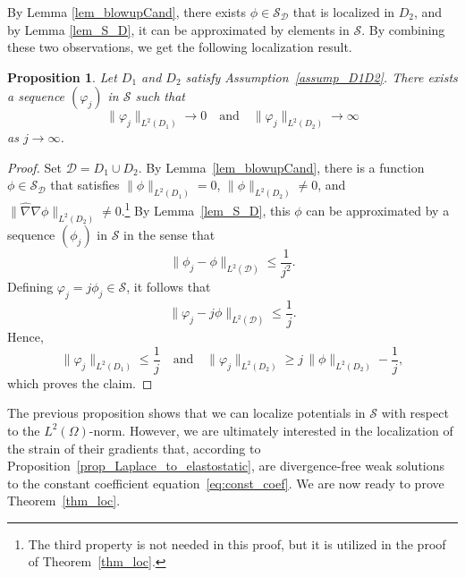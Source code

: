 \documentclass[reqno]{amsart}
\numberwithin{equation}{section}
\numberwithin{figure}{section}
\numberwithin{table}{section}
\newcommand{\norm}[1]{\lVert#1\rVert}
\newcommand{\D}{\mathcal{D}}
\theoremstyle{definition}
\theoremstyle{plain}
\newtheorem{prop}[thm]{Proposition}
\theoremstyle{definition}
\theoremstyle{remark}
\numberwithin{equation}{section}
\begin{document}
By Lemma \ref{lem_blowupCand}, there exists $\phi \in \mathcal{S}_{\D}$ that is localized in $D_2$, and by Lemma \ref{lem_S_D}, it can be approximated by elements in $\mathcal{S}$. By combining these two observations, we get the following localization result.

\begin{prop} \label{prop_localization1}
	Let $D_1$ and $D_2$ satisfy Assumption~\ref{assump_D1D2}. There exists a sequence $(\varphi_j)$ in $\mathcal{S}$ such that 
	\begin{equation*}
		\norm{\varphi_j}_{L^2(D_1)} \to 0 \quad \text{and} \quad \norm{\varphi_j}_{L^2(D_2)} \to \infty
	\end{equation*}
	as $j \to \infty$.
\end{prop}

\begin{proof}
	Set $\D = D_1 \cup D_2$. By Lemma~\ref{lem_blowupCand}, there is a function $\phi \in \mathcal{S}_{\D}$ that satisfies $\norm{\phi}_{L^2(D_1)} = 0$, $\norm{\phi}_{L^2(D_2)} \neq 0$, and $\norm{\widehat{\nabla}\nabla\phi}_{L^2(D_2)} \not= 0$.\footnote{The third property is not needed in this proof, but it is utilized in the proof of Theorem~\ref{thm_loc}.} By Lemma~\ref{lem_S_D}, this $\phi$ can be approximated by a sequence $(\phi_j)$ in $\mathcal{S}$ in the sense that 
	\begin{equation} \label{eq:phi_conv}
		\norm{\phi_j - \phi}_{L^2(\D) } \leq \frac{1}{j^2}.
	\end{equation}
	Defining $\varphi_j = j \phi_j \in\mathcal{S}$, it follows that
	\begin{equation*}
		\norm{\varphi_j - j \phi}_{L^2(\D) } \leq \frac{1}{j}.
	\end{equation*}
	Hence,
	\begin{equation*}
		\norm{\varphi_j}_{L^2(D_1)} \leq \frac{1}{j} \quad \text{and} \quad \norm{\varphi_j}_{L^2(D_2)} \geq j \, \norm{\phi}_{L^2(D_2)} - \frac{1}{j}, 
	\end{equation*}
	which proves the claim.
\end{proof}

The previous proposition shows that we can localize potentials in $\mathcal{S}$ with respect to the $L^2(\Omega)$-norm. However, we are ultimately interested in the localization of the strain of their gradients that, according to Proposition~\ref{prop_Laplace_to_elastostatic}, are divergence-free weak solutions to the constant coefficient equation~\eqref{eq:const_coef}. We are now ready to prove Theorem~\ref{thm_loc}.
\end{document}

